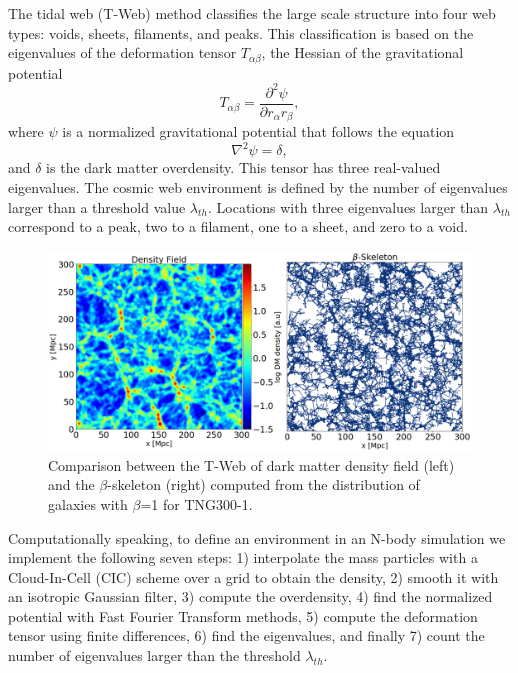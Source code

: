 \documentclass[usenatbib]{mnras}
\begin{document}
The tidal web (T-Web) method \citep{Hahn2007, Forero-Romero2009}
classifies the large scale structure into four web types: voids,
sheets, filaments, and peaks.   
This classification is based on the eigenvalues of the deformation
tensor $T_{\alpha\beta}$, the Hessian of the gravitational potential 
\begin{equation}
T_{\alpha\beta}=\frac{\partial^2\psi}{\partial r_{\alpha}r_{\beta}},
\end{equation}
%
where $\psi$ is a normalized gravitational potential that follows the equation
\begin{equation}
    \nabla^2 \psi = \delta,
\end{equation}
%
and $\delta$ is the dark matter overdensity.
This tensor has three real-valued eigenvalues. 
The cosmic web environment is defined by the number of eigenvalues
larger than a threshold value $\lambda_{th}$.
Locations with three eigenvalues larger than $\lambda_{th}$ correspond
to a peak, two to a filament, one to a sheet, and zero to a void.


\begin{figure}
\centering
 \includegraphics[scale=0.3]{Figs/p_Fig1_.png}%
 \caption{Comparison between the T-Web of dark matter density field
   (left) and the $\beta$-skeleton (right) computed from the
   distribution of galaxies with $\beta$=1 for TNG300-1.}  
 \label{fig:TWebBsk}
\end{figure}


Computationally speaking, to define an environment in an N-body
simulation we implement the following seven steps: 1) interpolate the
mass particles with a Cloud-In-Cell (CIC) scheme over a grid to
obtain the density, 2) smooth it with an isotropic Gaussian filter,
3) compute the overdensity, 4) find the normalized potential with Fast
Fourier Transform  methods, 5) compute the deformation tensor using
finite differences, 6) find the eigenvalues, and finally 7) count the
number of eigenvalues larger than the threshold $\lambda_{th}$.  
\end{document}
